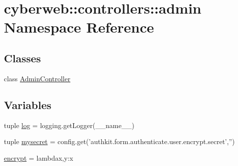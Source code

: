 \hypertarget{namespacecyberweb_1_1controllers_1_1admin}{\section{cyberweb\-:\-:controllers\-:\-:admin \-Namespace \-Reference}
\label{namespacecyberweb_1_1controllers_1_1admin}
}
\subsection*{\-Classes}
\begin{DoxyCompactItemize}
\item 
class \hyperlink{classcyberweb_1_1controllers_1_1admin_1_1_admin_controller}{\-Admin\-Controller}
\end{DoxyCompactItemize}
\subsection*{\-Variables}
\begin{DoxyCompactItemize}
\item 
tuple \hyperlink{namespacecyberweb_1_1controllers_1_1admin_acbcde37e994bb3b1f4f2ae704ce6ba52}{log} = logging.\-get\-Logger(\-\_\-\-\_\-name\-\_\-\-\_\-)
\item 
tuple \hyperlink{namespacecyberweb_1_1controllers_1_1admin_a36d13af11780771fa08c7fca0b10074b}{mysecret} = config.\-get('authkit.\-form.\-authenticate.\-user.\-encrypt.\-secret','')
\item 
\hyperlink{namespacecyberweb_1_1controllers_1_1admin_abf2604aa92a83ca421e67845eef74b29}{encrypt} = lambdax,y\-:x
\end{DoxyCompactItemize}


